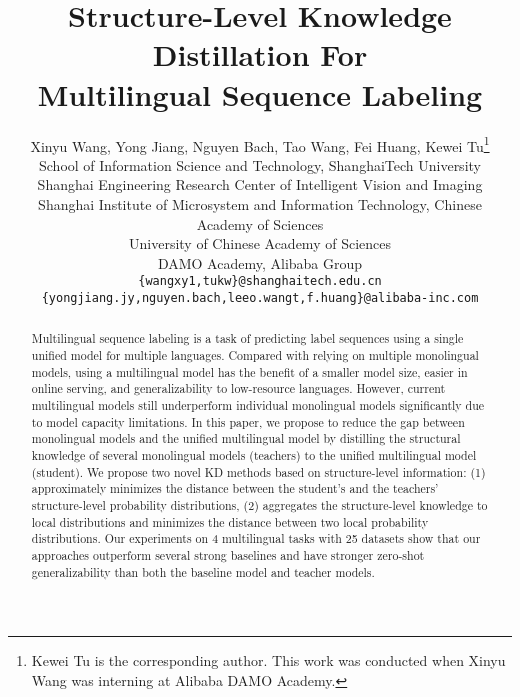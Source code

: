 \documentclass[11pt,a4paper]{article}
\title{{S}tructure-{L}evel {K}nowledge {D}istillation {F}or\\ {M}ultilingual {S}equence {L}abeling}
\author{Xinyu Wang, Yong Jiang, Nguyen Bach, Tao Wang, Fei Huang,  Kewei Tu\thanks{\hspace{1mm} Kewei Tu is the corresponding author. This work was conducted when Xinyu Wang was interning at Alibaba DAMO Academy.} \\
 School of Information Science and Technology, ShanghaiTech University \\
 Shanghai Engineering Research Center of Intelligent Vision and Imaging \\
 Shanghai Institute of Microsystem and Information Technology, Chinese Academy of Sciences \\
 University of Chinese Academy of Sciences \\
 DAMO Academy, Alibaba Group \\
  {\tt \{wangxy1,tukw\}@shanghaitech.edu.cn} \\
  {\tt \{yongjiang.jy,nguyen.bach,leeo.wangt,f.huang\}@alibaba-inc.com} \\
 }
\date{}
\begin{document}
\maketitle
\begin{abstract}




Multilingual sequence labeling is a task of predicting label sequences using a single unified model for multiple languages. Compared with relying on multiple monolingual models, using a multilingual model has the benefit of a smaller model size, easier in online serving, and generalizability to low-resource languages. However, current multilingual models still underperform individual monolingual models significantly due to model capacity limitations. In this paper, we propose to reduce the gap between monolingual models and the unified multilingual model by distilling the structural knowledge of several monolingual models (teachers) to the unified multilingual model (student). We propose two novel KD methods based on structure-level information: (1) approximately minimizes the distance between the student's and the teachers' structure-level probability distributions, (2) aggregates the structure-level knowledge to local distributions and minimizes the distance between two local probability distributions. Our experiments on 4 multilingual tasks with 25 datasets show that our approaches outperform several strong baselines and have stronger zero-shot generalizability than both the baseline model and teacher models.
\end{abstract}
\end{document}
